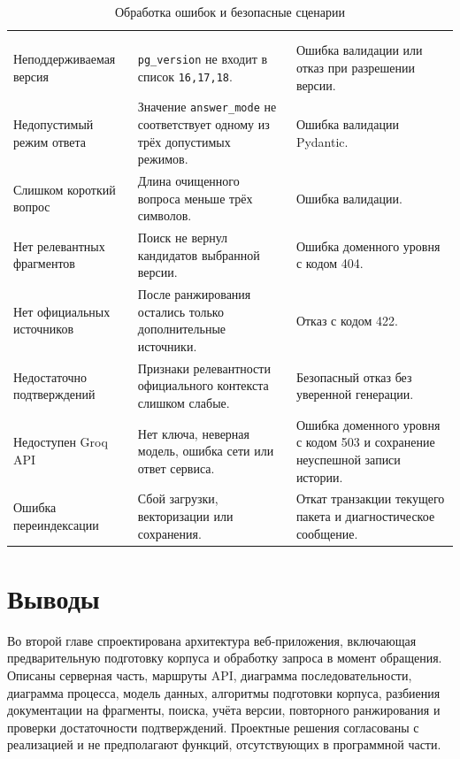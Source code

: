 \newpage
\begingroup
\centering
\small
{}\selectfont
\setlength{\tabcolsep}{3pt}
\begin{longtable}{|P{0.24\textwidth}|P{0.28\textwidth}|P{0.38\textwidth}|}
\caption{Обработка ошибок и безопасные сценарии}\label{tab:design-errors}\\
\hline
{} &  &  \\ \hline
\endfirsthead
{}\\
\hline
{} &  &  \\ \hline
\endhead
\endfoot
Неподдерживаемая версия & \texttt{pg\_version} не входит в список \texttt{16,17,18}. & Ошибка валидации или отказ при разрешении версии. \\ \hline
Недопустимый режим ответа & Значение \texttt{answer\_mode} не соответствует одному из трёх допустимых режимов. & Ошибка валидации Pydantic. \\ \hline
Слишком короткий вопрос & Длина очищенного вопроса меньше трёх символов. & Ошибка валидации. \\ \hline
Нет релевантных фрагментов & Поиск не вернул кандидатов выбранной версии. & Ошибка доменного уровня с кодом 404. \\ \hline
Нет официальных источников & После ранжирования остались только дополнительные источники. & Отказ с кодом 422. \\ \hline
Недостаточно подтверждений & Признаки релевантности официального контекста слишком слабые. & Безопасный отказ без уверенной генерации. \\ \hline
Недоступен Groq API & Нет ключа, неверная модель, ошибка сети или ответ сервиса. & Ошибка доменного уровня с кодом 503 и сохранение неуспешной записи истории. \\ \hline
Ошибка переиндексации & Сбой загрузки, векторизации или сохранения. & Откат транзакции текущего пакета и диагностическое сообщение. \\ \hline
\end{longtable}
\par\endgroup

\section{Выводы}

Во второй главе спроектирована архитектура веб-приложения, включающая предварительную подготовку корпуса и обработку запроса в момент обращения. Описаны серверная часть, маршруты API, диаграмма последовательности, диаграмма процесса, модель данных, алгоритмы подготовки корпуса, разбиения документации на фрагменты, поиска, учёта версии, повторного ранжирования и проверки достаточности подтверждений. Проектные решения согласованы с реализацией и не предполагают функций, отсутствующих в программной части.
